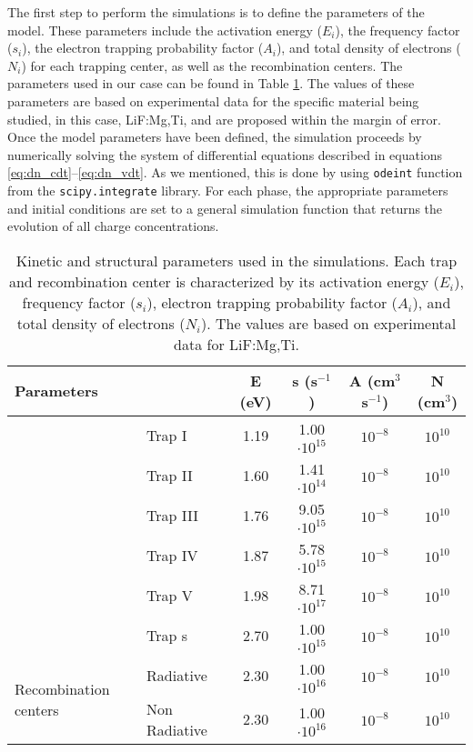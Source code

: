 \vspace{10pt}

The first step to perform the simulations is to define the parameters of the model. These parameters include the activation energy ($E_i$), the frequency factor ($s_i$), the electron trapping probability factor ($A_i$), and total density of electrons ($N_i$) for each trapping center, as well as the recombination centers. The parameters used in our case can be found in Table \ref{tab:simulationparameters}. The values of these parameters are based on experimental data \cite{benavente_LiF} for the specific material being studied, in this case, LiF:Mg,Ti, and are proposed within the margin of error. Once the model parameters have been defined, the simulation proceeds by numerically solving the system of differential equations described in equations \ref{eq:dn_cdt}--\ref{eq:dn_vdt}. As we mentioned, this is done by using \texttt{odeint} function from the \texttt{scipy.integrate} library. For each phase, the appropriate parameters and initial conditions are set to a general simulation function that returns the evolution of all charge concentrations. 


\renewcommand{\arraystretch}{1.5}
\begin{longtable}[c]{llcccc}
\caption[Kinetic and structural parameters used in the simulations.]{Kinetic and structural parameters used in the simulations. Each trap and recombination center is characterized by its activation energy ($E_i$), frequency factor ($s_i$), electron trapping probability factor ($A_i$), and total density of electrons ($N_i$). The values are based on experimental data for LiF:Mg,Ti.}
\label{tab:simulationparameters}\\
\hline
\multicolumn{2}{l}{Parameters} & \multicolumn{1}{c}{E (eV)} & \multicolumn{1}{c}{s (s$^{-1}$)} & \multicolumn{1}{c}{A (cm$^3$ s$^{-1}$)} & \multicolumn{1}{c}{N (cm$^3$)} \\ \hline
\endhead
%
\hline
\endfoot
%
\endlastfoot
%
\multirow{6}{*}{Trapping Centers}      & Trap I        & 1.19   & 1.00 $\cdot 10^{15}$ &  $10^{-8}$ &  $10^{10}$ \\
                                       & Trap II       & 1.60   & 1.41 $\cdot 10^{14}$ &  $10^{-8}$ &  $10^{10}$ \\
                                       & Trap III      & 1.76   & 9.05 $\cdot 10^{15}$ &  $10^{-8}$ &  $10^{10}$ \\
                                       & Trap IV       & 1.87   & 5.78 $\cdot 10^{15}$ &  $10^{-8}$ &  $10^{10}$ \\
                                       & Trap V        & 1.98   & 8.71 $\cdot 10^{17}$ &  $10^{-8}$ &  $10^{10}$ \\
                                       & Trap s        & 2.70   & 1.00 $\cdot 10^{15}$ &  $10^{-8}$ &  $10^{10}$ \\ \hline
\multirow{2}{*}{Recombination centers} & Radiative     & 2.30   & 1.00 $\cdot 10^{16}$ &  $10^{-8}$ &  $10^{10}$ \\
                                       & Non Radiative & 2.30   & 1.00 $\cdot 10^{16}$ &  $10^{-8}$ &  $10^{10}$ \\ \hline
\end{longtable}

